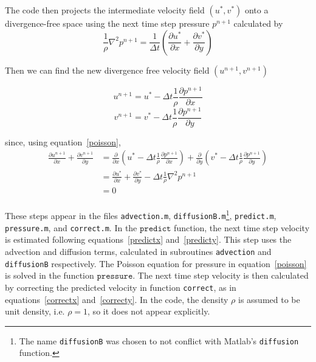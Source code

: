 \documentclass[12pt]{article}
\begin{document}
The code then projects the intermediate velocity field $(u^*,v^*)$ onto a divergence-free space using the next time step pressure $p^{n+1}$ calculated by
\begin{equation}
\frac{1}{\rho}\nabla^2 p^{n+1} = \frac{1}{\Delta t}\left( \frac{\partial u^*}{\partial x} + \frac{\partial v^*}{\partial y} \right)
\label{poisson}
\end{equation}

Then we can find the new divergence free velocity field $(u^{n+1},v^{n+1})$ 

\begin{equation}
u^{n+1}= u^* - \Delta t\frac{1}{\rho}\frac{\partial p^{n+1}}{\partial x}
\label{correctx}
\end{equation}
\begin{equation}
v^{n+1}= v^* - \Delta t\frac{1}{\rho}\frac{\partial p^{n+1}}{\partial y}
\label{correcty}
\end{equation}

since, using equation~\ref{poisson},
\begin{align*}
\frac{\partial  u^{n+1}}{\partial x} +  \frac{\partial  v^{n+1}}{\partial y}&= \frac{\partial}{\partial x}\left(u^* - \Delta t\frac{1}{\rho}\frac{\partial p^{n+1}}{\partial x} \right) + \frac{\partial}{\partial y}\left(v^* - \Delta t\frac{1}{\rho}\frac{\partial p^{n+1}}{\partial y} \right)\\
&= \frac{\partial u^*}{\partial x} + \frac{\partial v^*}{\partial y} - \Delta t\frac{1}{\rho}\nabla^2p^{n+1} \\
&= 0 \\
\end{align*}

These steps appear in the files \texttt{advection.m}, \texttt{diffusionB.m}\footnote{The name \texttt{diffusionB} was chosen to not conflict with Matlab's \texttt{diffusion} function.}, \texttt{predict.m}, \texttt{pressure.m}, and \texttt{correct.m}.  In the $\texttt{predict}$ function, the next time step velocity is estimated following equations~\ref{predictx} and~\ref{predicty}.  This step uses the advection and diffusion terms, calculated in subroutines \texttt{advection} and \texttt{diffusionB} respectively.  The Poisson equation for pressure in equation~\ref{poisson} is solved in the function $\texttt{pressure}$.  The next time step velocity is then calculated by correcting the predicted velocity in function \texttt{correct}, as in equations~\ref{correctx} and~\ref{correcty}.  In the code, the density $\rho$ is assumed to be unit density, i.e. $\rho = 1$, so it does not appear explicitly.  
\end{document}
